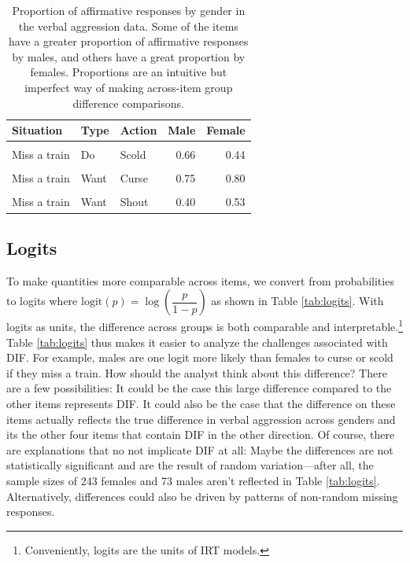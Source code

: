 \documentclass[
  english,
  man,floatsintext]{apa6}
\begin{document}
\begin{table}[H]

\caption{\label{tab:pvalues}Proportion of affirmative responses by gender in the verbal aggression data. Some of the items have a greater proportion of affirmative responses by males, and others have a great proportion by females. Proportions are an intuitive but imperfect way of making across-item group difference comparisons.}
\centering
\fontsize{10}{12}\selectfont
\begin{tabular}[t]{lllrr}
\toprule
Situation & Type & Action & Male & Female\\
\midrule
\cellcolor{gray!6}{Miss a train} & \cellcolor{gray!6}{Do} & \cellcolor{gray!6}{Curse} & \cellcolor{gray!6}{0.81} & \cellcolor{gray!6}{0.61}\\
Miss a train & Do & Scold & 0.66 & 0.44\\
\cellcolor{gray!6}{Miss a train} & \cellcolor{gray!6}{Do} & \cellcolor{gray!6}{Shout} & \cellcolor{gray!6}{0.29} & \cellcolor{gray!6}{0.23}\\
Miss a train & Want & Curse & 0.75 & 0.80\\
\cellcolor{gray!6}{Miss a train} & \cellcolor{gray!6}{Want} & \cellcolor{gray!6}{Scold} & \cellcolor{gray!6}{0.60} & \cellcolor{gray!6}{0.63}\\
\addlinespace
Miss a train & Want & Shout & 0.40 & 0.53\\
\bottomrule
\end{tabular}
\end{table}

\hypertarget{logits}{%
\subsection{Logits}\label{logits}}

To make quantities more comparable across items, we convert from probabilities to logits where \(\text{logit}(p) = \log\left(\dfrac{p}{1 - p}\right)\) as shown in Table \ref{tab:logits}. With logits as units, the difference across groups is both comparable and interpretable.\footnote{Conveniently, logits are the units of IRT models.} Table \ref{tab:logits} thus makes it easier to analyze the challenges associated with DIF. For example, males are one logit more likely than females to curse or scold if they miss a train. How should the analyst think about this difference? There are a few possibilities: It could be the case this large difference compared to the other items represents DIF. It could also be the case that the difference on these items actually reflects the true difference in verbal aggression across genders and its the other four items that contain DIF in the other direction. Of course, there are explanations that no not implicate DIF at all: Maybe the differences are not statistically significant and are the result of random variation---after all, the sample sizes of 243 females and 73 males aren't reflected in Table \ref{tab:logits}. Alternatively, differences could also be driven by patterns of non-random missing responses.
\end{document}
